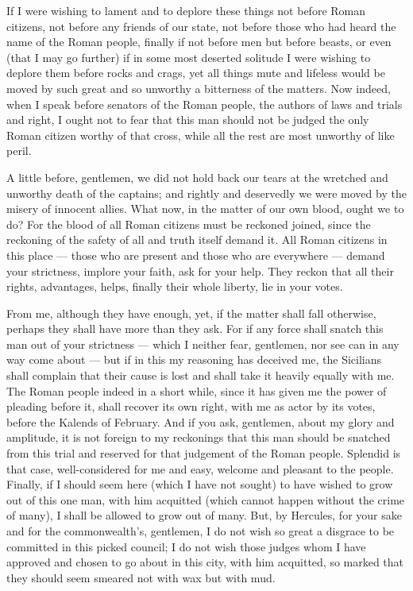  If I were wishing to lament and to deplore these things not before Roman citizens, not before any friends of our state, not before those who had heard the name of the Roman people, finally if not before men but before beasts, or even (that I may go further) if in some most deserted solitude I were wishing to deplore them before rocks and crags, yet all things mute and lifeless would be moved by such great and so unworthy a bitterness of the matters. Now indeed, when I speak before senators of the Roman people, the authors of laws and trials and right, I ought not to fear that this man should not be judged the only Roman citizen worthy of that cross, while all the rest are most unworthy of like peril.

 A little before, gentlemen, we did not hold back our tears at the wretched and unworthy death of the captains; and rightly and deservedly we were moved by the misery of innocent allies. What now, in the matter of our own blood, ought we to do? For the blood of all Roman citizens must be reckoned joined, since the reckoning of the safety of all and truth itself demand it. All Roman citizens in this place --- those who are present and those who are everywhere --- demand your strictness, implore your faith, ask for your help. They reckon that all their rights, advantages, helps, finally their whole liberty, lie in your votes.

 From me, although they have enough, yet, if the matter shall fall otherwise, perhaps they shall have more than they ask. For if any force shall snatch this man out of your strictness --- which I neither fear, gentlemen, nor see can in any way come about --- but if in this my reasoning has deceived me, the Sicilians shall complain that their cause is lost and shall take it heavily equally with me. The Roman people indeed in a short while, since it has given me the power of pleading before it, shall recover its own right, with me as actor by its votes, before the Kalends of February. And if you ask, gentlemen, about my glory and amplitude, it is not foreign to my reckonings that this man should be snatched from this trial and reserved for that judgement of the Roman people. Splendid is that case, well-considered for me and easy, welcome and pleasant to the people. Finally, if I should seem here (which I have not sought) to have wished to grow out of this one man, with him acquitted (which cannot happen without the crime of many), I shall be allowed to grow out of many. But, by Hercules, for your sake and for the commonwealth's, gentlemen, I do not wish so great a disgrace to be committed in this picked council; I do not wish those judges whom I have approved and chosen to go about in this city, with him acquitted, so marked that they should seem smeared not with wax but with mud.

